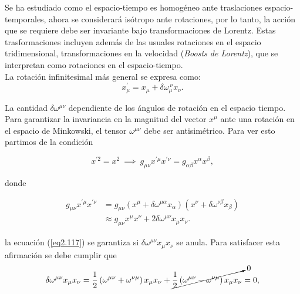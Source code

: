 \vspace{0.3cm}

Se ha estudiado como el espacio-tiempo es homogéneo ante traslaciones espacio-temporales, ahora se considerará isótropo ante rotaciones, por lo tanto, la acción que se requiere debe ser invariante bajo transformaciones de Lorentz. Estas trasformaciones incluyen además de las usuales rotaciones en el espacio tridimensional, transformaciones en la velocidad (\emph{Boosts de Lorentz}), que se interpretan como rotaciones en el espacio-tiempo.\\

\noindent
La rotación infinitesimal más general se expresa como:
\begin{equation}
    x^{\prime}_{\mu}=x_{\mu}+\delta\omega_{\mu}^{~\nu} x_{\nu}.
\end{equation}


La cantidad $\delta \omega^{\mu \nu}$ dependiente de los ángulos de rotación en el espacio tiempo.
Para garantizar la invariancia en la magnitud del vector $x^{\mu}$ ante una rotación en el espacio de Minkowski, el tensor $\omega^{\mu \nu}$ debe ser antisimétrico. Para ver esto partimos de la condición

\begin{equation}
    x^{\prime 2}=x^{2}~\implies ~g_{\mu \nu }x^{\prime \mu }x^{\prime \nu
}=g_{\alpha \beta }x^{\alpha }x^{\beta },
\end{equation}

donde

\begin{equation}
    \begin{split}
    g_{\mu \nu }x^{\prime \mu }x^{\prime \nu } & = g_{\mu \nu }\left( x^{\mu}+\delta \omega ^{\mu \alpha }x_{\alpha }\right) \left( x^{\nu }+\delta \omega ^{\nu \beta }x_{\beta }\right)  \\
    & \approx g_{\mu \nu }x^{\mu }x^{\nu }+2\delta \omega ^{\mu \nu }x_{\mu}x_{\nu }.
    \end{split}
    \label{eq2.117}
\end{equation}

la ecuación (\ref{eq2.117}) se garantiza si $\delta \omega ^{\mu \nu }x_{\mu}x_{\nu}$ se anula. Para satisfacer esta afirmación se debe cumplir que
\begin{equation}
    \delta \omega ^{\mu \nu }x_{\mu }x_{\nu } = \frac{1}{2}\left( \omega ^{\mu \nu}+\omega ^{\nu \mu }\right) x_{\mu }x_{\nu }+\cancelto{0}{ \frac{1}{2}\left( \omega ^{\mu \nu }-\omega ^{\nu \mu }\right) x_{\mu }x_{\nu }}=0,
    \label{eq2.118}
\end{equation}


